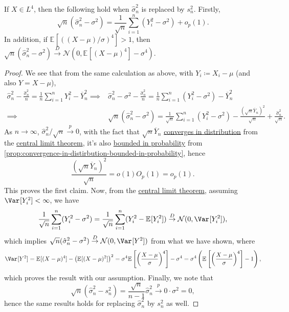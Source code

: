 \begin{proposition}\label{prop:inference-variance}
	If \(X \in L^4\), then the following hold when \(\hat{\sigma} _n^2\) is replaced by \(s_n^2\). Firstly,
	\[
		\sqrt{n} (\hat{\sigma} _n^2 - \sigma ^2)
		= \frac{1}{\sqrt{n} } \sum_{i=1}^{n} (Y_i^2 - \sigma ^2) + o_p(1).
	\]
	In addition, if \(\mathbb{E}_{}[( (X-\mu ) / \sigma ) ^4 ] > 1\), then \(\sqrt{n} (\hat{\sigma} _n^2 - \sigma ^2) \overset{D}{\to} \mathcal{N} (0, \mathbb{E}_{}[(X-\mu )^4 ] - \sigma ^4)\).
\end{proposition}
\begin{proof}
	We see that from the same calculation as above, with \(Y_i \coloneqq X_i - \mu \) (and also \(Y = X - \mu \)),
	\[
		\begin{split}
			\hat{\sigma} _n^2 - \frac{\hat{\sigma} _n^2}{n} = \frac{1}{n} \sum_{i=1}^{n} Y_i^2 - \overline{Y} _n^2
			\implies & \hat{\sigma} _n^2 - \sigma ^2 - \frac{\hat{\sigma} _n^2}{n} = \frac{1}{n} \sum_{i=1}^{n} (Y_i^2 - \sigma ^2)- \overline{Y} _n^2                                                           \\
			\implies & \sqrt{n}(\hat{\sigma } _n^2 - \sigma ^2) = \frac{1}{\sqrt{n} } \sum_{i=1}^{n} (Y_i^2 - \sigma ^2) - \frac{(\sqrt{n} \overline{Y} _n)^2}{\sqrt{n} } + \frac{\hat{\sigma} _n^2}{\sqrt{n} }.
		\end{split}
	\]
	As \(n \to \infty \), \(\hat{\sigma} _n^2 / \sqrt{n} \overset{p}{\to } 0\), with the fact that \(\sqrt{n} \overline{Y} _n\) \hyperref[def:converge-in-distribution]{converges in distribution} from the \hyperref[thm:CLT]{central limit theorem}, it's also \hyperref[def:bounded-in-probability]{bounded in probability} from \autoref{prop:convergence-in-distirbution-bounded-in-probability}, hence
	\[
		\frac{(\sqrt{n} \overline{Y} _n) ^2}{\sqrt{n} }
		= o(1) O_p(1)
		= o_p(1).
	\]
	This proves the first claim. Now, from the \hyperref[thm:CLT]{central limit theorem}, assuming \(\Var_{}[Y_i^2] < \infty \), we have
	\[
		\frac{1}{\sqrt{n} } \sum_{i=1}^{n} (Y_i^2 - \sigma ^2)
		= \frac{1}{\sqrt{n} } \sum_{i=1}^{n} (Y_i^2 - \mathbb{E}_{}[Y_i^2] )
		\overset{D}{\to } \mathcal{N} (0, \Var_{}[Y_i^2] ),
	\]
	which implies \(\sqrt{n} (\hat{\sigma} _n^2 - \sigma ^2) \overset{D}{\to } \mathcal{N} (0, \Var_{}[Y^2] )\) from what we have shown, where
	\[
		\Var_{}[Y^2]
		= \mathbb{E}_{}[(X - \mu )^4]  - \left( \mathbb{E}_{}[(X-\mu )^2] \right) ^2
		= \sigma ^4 \mathbb{E}_{}\left[\left( \frac{X-\mu }{\sigma } \right) ^4 \right] - \sigma ^4
		= \sigma ^4 \left( \mathbb{E}_{}\left[\left( \frac{X-\mu }{\sigma } \right) ^4 \right] - 1 \right),
	\]
	which proves the result with our assumption. Finally, we note that
	\[
		\sqrt{n} (\hat{\sigma} _n^2 - s_n^2) = \frac{\sqrt{n} }{n-1} \hat{\sigma} _n^2 \overset{p}{\to} 0 \cdot \sigma ^2 = 0,
	\]
	hence the same results holds for replacing \(\hat{\sigma} _n^2\) by \(s_n^2\) as well.
\end{proof}

